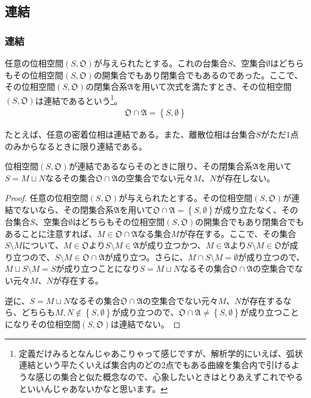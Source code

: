 \documentclass[dvipdfmx]{jsarticle}
\begin{document}
\subsection{連結}%
\subsubsection{連結}%
\begin{dfn}
任意の位相空間$\left( S,\mathfrak{O} \right)$が与えられたとする。これの台集合$S$、空集合$\emptyset$はどちらもその位相空間$\left( S,\mathfrak{O} \right)$の開集合でもあり閉集合でもあるのであった。ここで、その位相空間$\left( S,\mathfrak{O} \right)$の閉集合系$\mathfrak{A}$を用いて次式を満たすとき、その位相空間$\left( S,\mathfrak{O} \right)$は連結であるという\footnote{定義だけみるとなんじゃあこりゃって感じですが、解析学的にいえば、弧状連結という平たくいえば集合内のどの2点でもある曲線を集合内で引けるような感じの集合と似た概念なので、心象したいときはとりあえずこれでやるといいんじゃあないかなと思います。}。
\begin{align*}
\mathfrak{O \cap A} = \left\{ S,\emptyset \right\}
\end{align*}
\end{dfn}\par
たとえば、任意の密着位相は連結である。また、離散位相は台集合$S$がただ1点のみからなるときに限り連結である。
\begin{thm}\label{8.1.5.1}
位相空間$\left( S,\mathfrak{O} \right)$が連結であるならそのときに限り、その閉集合系$\mathfrak{A}$を用いて$S = M \sqcup N$なるその集合$\mathfrak{O \cap A}$の空集合でない元々$M$、$N$が存在しない。
\end{thm}
\begin{proof}
任意の位相空間$\left( S,\mathfrak{O} \right)$が与えられたとする。その位相空間$\left( S,\mathfrak{O} \right)$が連結でないなら、その閉集合系$\mathfrak{A}$を用いて$\mathfrak{O \cap A} =\left\{ S,\emptyset \right\}$が成り立たなく、その台集合$S$、空集合$\emptyset$はどちらもその位相空間$\left( S,\mathfrak{O} \right)$の開集合でもあり閉集合でもあることに注意すれば、$M\in \mathfrak{O \cap A}$なる集合$M$が存在する。ここで、その集合$S \setminus M$について、$M\in \mathfrak{O}$より$S \setminus M\in \mathfrak{A}$が成り立つかつ、$M\in \mathfrak{A}$より$S \setminus M\in \mathfrak{O}$が成り立つので、$S \setminus M\in \mathfrak{O \cap A}$が成り立つ。さらに、$M \cap S \setminus M = \emptyset$が成り立つので、$M \sqcup S \setminus M = S$が成り立つことになり$S = M \sqcup N$なるその集合$\mathfrak{O \cap A}$の空集合でない元々$M$、$N$が存在する。\par
逆に、$S = M \sqcup N$なるその集合$\mathfrak{O \cap A}$の空集合でない元々$M$、$N$が存在するなら、どちらも$M,N \notin \left\{ S,\emptyset \right\}$が成り立つので、$\mathfrak{O \cap A \neq}\left\{ S,\emptyset \right\}$が成り立つことになりその位相空間$\left( S,\mathfrak{O} \right)$は連結でない。
\end{proof}
\end{document}
